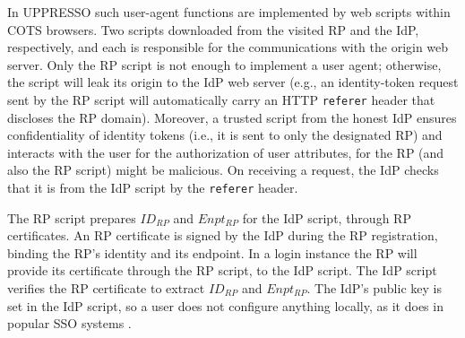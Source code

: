 In UPPRESSO such user-agent functions are implemented by web scripts within COTS browsers.
Two scripts downloaded from the visited RP and the IdP, respectively,
    and each is responsible for the communications with the origin web server.
Only the RP script is not enough to implement a user agent;
    otherwise, the script will leak its origin to the IdP web server
    (e.g.,
    an identity-token request sent by the RP script will
automatically carry an HTTP \verb+referer+ header that discloses the RP domain).
Moreover, a trusted script from the honest IdP
ensures confidentiality of identity tokens (i.e., it is sent to only the designated RP)
and interacts with the user for the authorization of user attributes,
    for the RP (and also the RP script) might be malicious.
On receiving a request,
    the IdP checks that it is from the IdP script by the \verb+referer+ header.

The RP script prepares $ID_{RP}$ and $Enpt_{RP}$ for the IdP script, through RP certificates.
An RP certificate is signed by the IdP during the RP registration,
     binding the RP's identity and its endpoint. %
In a login instance
    the RP will provide its certificate through the RP script, to the IdP script.
The IdP script %
    verifies the RP certificate to extract $ID_{RP}$ and $Enpt_{RP}$.
The IdP's public key is set in the IdP script, so
 a user does not configure anything locally,
    as it does in popular SSO systems \cite{OpenIDConnect, rfc6749, SAML,SAMLIdentifier}.


